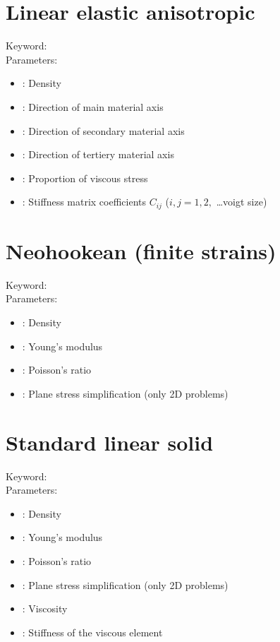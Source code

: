 \section{Linear elastic anisotropic}

Keyword: \\

\noindent Parameters:
\begin{itemize}
\item {}: Density
\item {}: Direction of main material axis
\item {}: Direction of secondary material axis
\item {}: Direction of tertiery material axis
\item {}: Proportion of viscous stress
\item {}: Stiffness matrix coefficients $C_{ij}$ ($i,j = 1,2,$ \dots voigt size)
\end{itemize}

\section{Neohookean (finite strains)}

Keyword: \\

\noindent Parameters:
\begin{itemize}
\item {}: Density
\item {}: Young's modulus
\item {}: Poisson's ratio
\item {}: Plane stress simplification (only 2D problems)
\end{itemize}

\section{Standard linear solid}

Keyword: \\

\noindent Parameters:
\begin{itemize}
\item {}: Density
\item {}: Young's modulus
\item {}: Poisson's ratio
\item {}: Plane stress simplification (only 2D problems)
\item {}: Viscosity
\item {}: Stiffness of the viscous element
\end{itemize}

